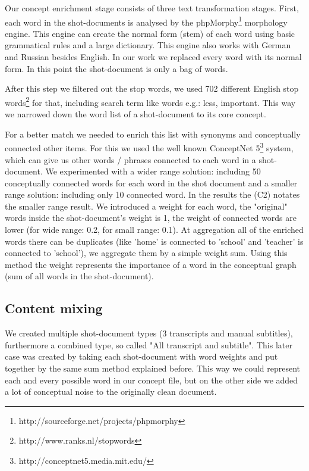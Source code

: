 \documentclass{acm_proc_article-me}
\begin{document}
Our concept enrichment stage consists of three text transformation stages. First, each word in the shot-documents is analysed by the phpMorphy\footnote{http://sourceforge.net/projects/phpmorphy} morphology engine. This engine can create the normal form (stem) of each word using basic grammatical rules and a large dictionary. This engine also works with German and Russian besides English. In our work we replaced every word with its normal form. In this point the shot-document is only a bag of words.

After this step we filtered out the stop words, we used 702 different English stop words\footnote{http://www.ranks.nl/stopwords} for that, including search term like words e.g.: less, important.
This way we narrowed down the word list of a shot-document to its core concept.

For a better match we needed to enrich this list with synonyms and conceptually connected other items. For this we used the well known ConceptNet 5\footnote{http://conceptnet5.media.mit.edu/} system, which can give us other words / phrases connected to each word in a shot-document. We experimented with a wider range solution: including 50 conceptually connected words for each word in the shot document and a smaller range solution: including only 10 connected word. In the results the (C2) notates the smaller range result. We introduced a weight for each word, the "original" words inside the shot-document's weight is 1, the weight of connected words are lower (for wide range: 0.2, for small range: 0.1). At aggregation all of the enriched words there can be duplicates (like 'home' is connected to 'school' and 'teacher' is connected to 'school'), we aggregate them by a simple weight sum. Using this method the weight represents the importance of a word in the conceptual graph (sum of all words in the shot-document).

\subsection{Content mixing}

We created multiple shot-document types (3 transcripts and manual subtitles), furthermore a combined type, so called "All transcript and subtitle". This later case was created by taking each shot-document with word weights and put together by the same sum method explained before. This way we could represent each and every possible word in our concept file, but on the other side we added a lot of conceptual noise to the originally clean document.
\end{document}
